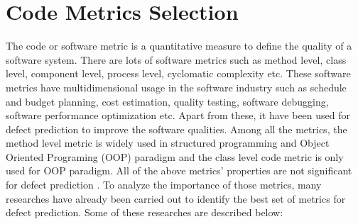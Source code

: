 \documentclass[12pt]{report}
\begin{document}
\section{Code Metrics Selection}
    
The code or software metric is a quantitative measure to define the quality of a software system. There are lots of software metrics such as method level, class level, component level, process level, cyclomatic complexity etc. 
These software metrics have multidimensional usage in the software industry such as schedule and budget planning, cost estimation, quality testing, software debugging, software performance optimization etc. Apart from these, it have been used for defect prediction to improve the software qualities. Among all the metrics, the method level metric is widely used in structured programming and Object Oriented Programing (OOP) paradigm and the class level code metric is only used for OOP paradigm. All of the above metrics' properties are not significant for defect prediction \cite{catal2009systematic,pai2007empirical,zhou2006empirical}. To analyze the importance of those metrics, many researches have already been carried out to identify the best set of metrics for defect prediction. Some of these researches are described below:
 
\end{document}
